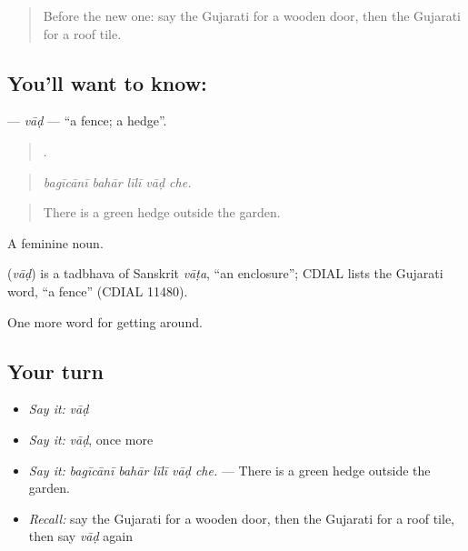 \label{lesson:GU-C420-vad}



\begin{quote}
Before the new one: say the Gujarati for a wooden door, then the Gujarati for a roof tile.
\end{quote}

\subsection*{You'll want to know: }
\textbf{} — \emph{vāḍ} — \textquotedblleft{}a fence; a hedge\textquotedblright{}.

\begin{quote}
    .
\end{quote}

\begin{quote}
\emph{bagīcānī bahār līlī vāḍ che.}
\end{quote}

\begin{quote}
There is a green hedge outside the garden.
\end{quote}

A feminine noun.

\begin{cousinweb}
\textbf{} (\emph{vāḍ}) is a tadbhava of Sanskrit \emph{vāṭa}, \textquotedblleft{}an enclosure\textquotedblright{}; CDIAL lists the Gujarati word, \textquotedblleft{}a fence\textquotedblright{} (CDIAL 11480).
\end{cousinweb}

\begin{grammarlens}[title={What you've built}]
One more word for getting around.
\end{grammarlens}

\subsection*{Your turn}
\begin{itemize}
\raggedright
  \item \emph{Say it:} \emph{vāḍ}
  \item \emph{Say it:} \emph{vāḍ}, once more
  \item \emph{Say it:} \emph{bagīcānī bahār līlī vāḍ che.} — There is a green hedge outside the garden.
  \item \emph{Recall:} say the Gujarati for a wooden door, then the Gujarati for a roof tile, then say \emph{vāḍ} again
\end{itemize}

